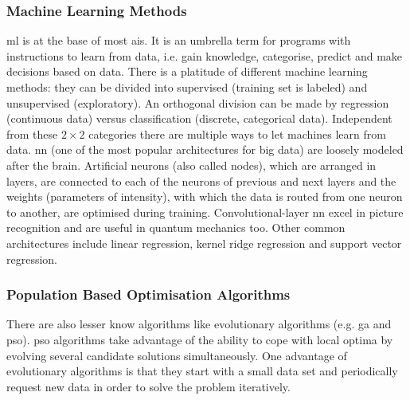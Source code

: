 \subsubsection{Machine Learning Methods}
%
%
\Gls{ml} is at the base of most \gls{ai}s.
It is an umbrella term for programs with instructions to learn from data, i.e. gain knowledge, categorise, predict and make decisions based on data. 
%
There is a platitude of different machine learning methods: 
they can be divided into supervised (training set is labeled) and unsupervised (exploratory).  
An orthogonal division can be made by regression (continuous data) versus classification (discrete, categorical data). 
Independent from these $2\times2$ categories there are multiple ways to let machines learn from data.
%
\Gls{nn} (one of the most popular architectures for big data\cite{Chiroma2019}) are loosely modeled after the brain\cite{bishop1994neural}.
Artificial neurons (also called nodes), which are arranged in layers, 
are connected to each of the neurons of previous and next layers
and the weights (parameters of intensity), with which the data is routed from one neuron to another, 
are optimised during training. 
%
Convolutional-layer \gls{nn} excel in picture recognition\cite{Lecun1995conv} and are useful in quantum mechanics too\cite{westermayr2020combining}.
Other common architectures include linear regression, kernel ridge regression and support vector regression.



\subsubsection{Population Based Optimisation Algorithms}

There are also lesser know algorithms like 
evolutionary algorithms (e.g. \gls{ga} and \gls{pso}).
\gls{pso} algorithms take advantage of the ability to cope with local optima by evolving several candidate solutions simultaneously\cite{villanova2010function}.
%
One advantage of evolutionary algorithms is that they start with a small data set
and periodically request new data in order to solve the problem iteratively.

